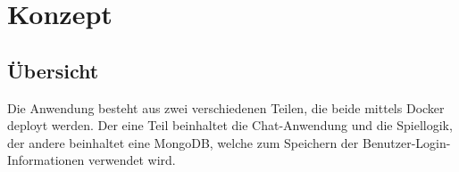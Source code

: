 
\chapter{Konzept}\label{cha:Konzept}
\section{Übersicht}\label{sec:Übersicht}
Die Anwendung besteht aus zwei verschiedenen Teilen, die beide mittels Docker deployt werden. 
Der eine Teil beinhaltet die Chat-Anwendung und die Spiellogik, der andere beinhaltet eine MongoDB, welche zum Speichern der Benutzer-Login-Informationen verwendet wird. 
